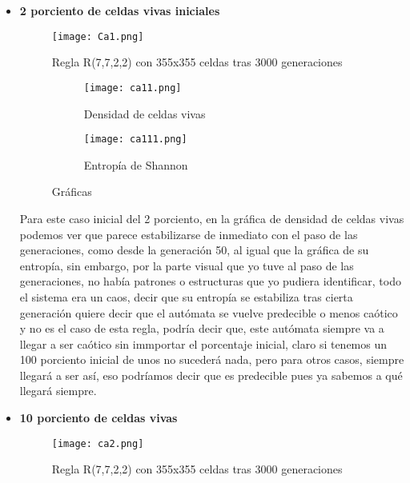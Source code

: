 \documentclass{article}
\begin{document}
 	\begin{itemize}
 		\vspace{300pt}
 		\item \textbf{2 porciento de celdas vivas iniciales}
 		
 		\begin{figure}[htbp]
 			\centering       
 			\texttt{[image: Ca1.png]}
 			\caption{Regla R(7,7,2,2) con 355x355 celdas tras 3000 generaciones}
 			\label{fig:300} 
 		\end{figure}
 		
 		\begin{figure}[htbp]
 			\centering
 			\begin{subfigure}{0.48\textwidth}
 				\centering
 				\texttt{[image: ca11.png]}
 				\caption{Densidad de celdas vivas}
 				\label{fig:A547}
 			\end{subfigure}
 			\hfill
 			\begin{subfigure}{0.48\textwidth}
 				\centering
 				\texttt{[image: ca111.png]}
 				\caption{Entropía de Shannon}
 				\label{fig:A6}
 			\end{subfigure}
 			\caption{Gráficas}
 			\label{fig:A77}
 		\end{figure}
 		
 		Para este caso inicial del 2 porciento, en la gráfica de densidad de celdas vivas podemos ver que parece estabilizarse de inmediato con el paso de las generaciones, como desde la generación 50, al igual que la gráfica de su entropía, sin embargo, por la parte visual que yo tuve al paso de las generaciones, no había patrones o estructuras que yo pudiera identificar, todo el sistema era un caos, decir que su entropía se estabiliza tras cierta generación quiere decir que el autómata se vuelve predecible o menos caótico y no es el caso de esta regla, podría decir que, este autómata siempre va a llegar a ser caótico sin immportar el porcentaje inicial, claro si tenemos un 100 porciento inicial de unos no sucederá nada, pero para otros casos, siempre llegará a ser así, eso podríamos decir que es predecible pues ya sabemos a qué llegará siempre.
 		
 		\vspace{300pt}
 		\item \textbf{10 porciento de celdas vivas}
 		
 		\begin{figure}[htbp]
 			\centering       
 			\texttt{[image: ca2.png]}
 			\caption{Regla R(7,7,2,2) con 355x355 celdas tras 3000 generaciones}
 			\label{fig:300} 
 		\end{figure}
 		

\end{itemize}
\end{document}
